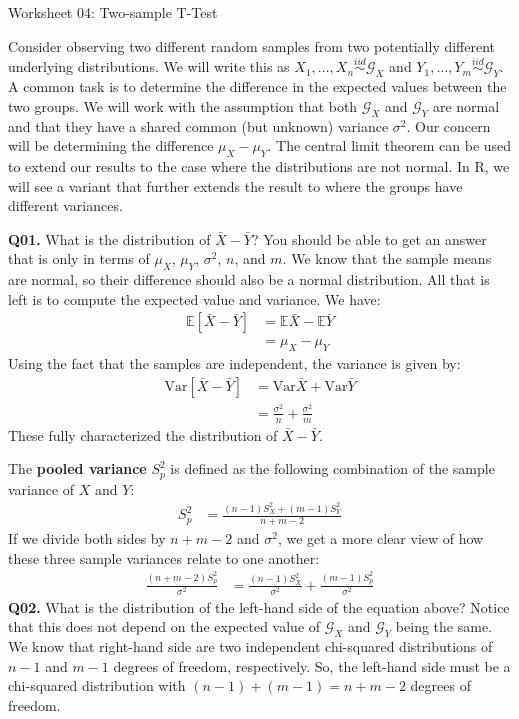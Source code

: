 \documentclass[12pt]{article}
\newcommand{\E}{\mathbb{E}}
\newcommand{\V}{\text{Var}}
\newcommand{\iid}{\stackrel{iid}{\sim}}
\newcommand{\cblack}{\color{Black}}
\newcommand{\cblue}{\color{MidnightBlue}}
\begin{document}
{\large Worksheet 04: Two-sample T-Test}

\vspace*{18pt}
Consider observing two different random samples from two
potentially different underlying distributions. We will 
write this as $X_1, \ldots, X_n \iid \mathcal{G}_X$ and
$Y_1, \ldots, Y_m \iid \mathcal{G}_Y$. A common task is
to determine the difference in the expected values between
the two groups. We will work with the assumption that 
both $\mathcal{G}_X$ and $\mathcal{G}_Y$ are normal and
that they have a shared common (but unknown) variance $\sigma^2$.
Our concern will be determining the difference $\mu_X - \mu_Y$.
The central limit theorem can be used to extend our results
to the case where the distributions are not normal. In R,
we will see a variant that further extends the result to
where the groups have different variances.

\textbf{Q01.} What is the distribution of $\bar{X} - \bar{Y}$?
You should be able to get an answer that is only in terms of
$\mu_X$, $\mu_Y$, $\sigma^2$, $n$, and $m$. \cblue We know
that the sample means are normal, so their difference should also
be a normal distribution. All that is left is to compute the
expected value and variance. We have:
\begin{align*}
\E \left[ \bar{X} - \bar{Y} \right] &= \E \bar{X} - \E \bar{Y} \\
&= \mu_X - \mu_Y
\end{align*}
Using the fact that the samples are independent, the variance is
given by:
\begin{align*}
\V \left[ \bar{X} - \bar{Y} \right] &= \V \bar{X} + \V \bar{Y} \\
&= \frac{\sigma^2}{n} + \frac{\sigma^2}{m}
\end{align*}
These fully characterized the distribution of $\bar{X} - \bar{Y}$.
\cblack

The \textbf{pooled variance} $S_p^2$ is defined as the following
combination of the sample variance of $X$ and $Y$:
\begin{align*}
S_p^2 &= \frac{(n-1) S_X^2 + (m - 1) S_Y^2}{n + m - 2}
\end{align*}
If we divide both sides by $n + m - 2$ and $\sigma^2$, we get a
more clear view of how these three sample variances relate to one
another:
\begin{align*}
\frac{(n + m - 2) S_p^2}{\sigma^2} &= \frac{(n - 1) S_X^2}{\sigma^2} + \frac{(m - 1) S_p^2}{\sigma^2}
\end{align*}
\textbf{Q02.} What is the distribution of the left-hand side of the equation
above? Notice that this
does not depend on the expected value of $\mathcal{G}_X$ and
$\mathcal{G}_Y$ being the same. \cblue We know that right-hand side are 
two independent chi-squared distributions of $n-1$ and $m-1$ degrees of
freedom, respectively. So, the left-hand side must be a chi-squared
distribution with $(n - 1) + (m - 1) = n + m - 2$ degrees of freedom. \cblack
\end{document}
